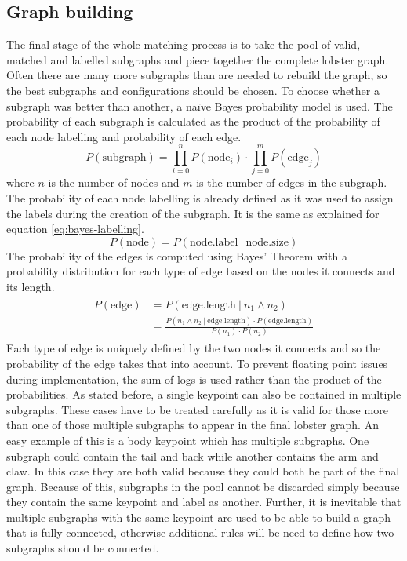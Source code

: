 \subsection{Graph building}\label{sec:graph-creation}
The final stage of the whole matching process is to take the pool of valid, matched and labelled subgraphs and piece together the complete lobster graph. Often there are many more subgraphs than are needed to rebuild the graph, so the best subgraphs and configurations should be chosen. To choose whether a subgraph was better than another, a na\"{i}ve Bayes probability model is used. The probability of each subgraph is calculated as the product of the probability of each node labelling and probability of each edge. 
\begin{equation}
P(\text{subgraph}) = \prod_{i=0}^n P(\text{node}_{i}) \cdot \prod_{j=0}^m P(\text{edge}_{j})
\end{equation}
where $n$ is the number of nodes and $m$ is the number of edges in the subgraph. The probability of each node labelling is already defined as it was used to assign the labels during the creation of the subgraph. It is the same as explained for equation \ref{eq:bayes-labelling}.
\begin{equation}
P(\text{node}) = P(\text{node.label}\ |\ \text{node.size})
\end{equation}
The probability of the edges is computed using Bayes' Theorem with a probability distribution for each type of edge based on the nodes it connects and its length. 
\begin{align}
\begin{split}
P(\text{edge}) &= P(\text{edge.length}\ |\ n_{1} \wedge n_{2}) \\
 &= \frac{P(n_{1} \wedge n_{2}\ |\ \text{edge.length}) \cdot P(\text{edge.length})}{P(n_{1}) \cdot P(n_{2})}
\end{split}
\end{align}
Each type of edge is uniquely defined by the two nodes it connects and so the probability of the edge takes that into account. To prevent floating point issues during implementation, the sum of logs is used rather than the product of the probabilities. 
\n
As stated before, a single keypoint can also be contained in multiple subgraphs. These cases have to be treated carefully as it is valid for those more than one of those multiple subgraphs to appear in the final lobster graph. An easy example of this is a body keypoint which has multiple subgraphs. One subgraph could contain the tail and back while another contains the arm and claw. In this case they are both valid because they could both be part of the final graph. Because of this, subgraphs in the pool cannot be discarded simply because they contain the same keypoint and label as another. Further, it is inevitable that multiple subgraphs with the same keypoint are used to be able to build a graph that is fully connected, otherwise additional rules will be need to define how two subgraphs should be connected.
